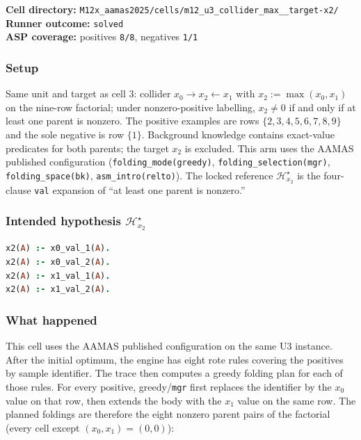 \documentclass[11pt]{article}
\begin{document}
\textbf{Cell directory:} \texttt{M12x\_aamas2025/cells/m12\_u3\_collider\_max\_\_target-x2/}\\
\textbf{Runner outcome:} \texttt{solved}\\
\textbf{ASP coverage:} positives \texttt{8/8}, negatives \texttt{1/1}

\subsubsection{Setup}

Same unit and target as cell 3: collider \(x_0\to x_2\leftarrow x_1\) with \(x_2:=\max(x_0,x_1)\) on the nine-row factorial; under nonzero-positive labelling, \(x_2\neq 0\) if and only if at least one parent is nonzero. The positive examples are rows \(\{2,3,4,5,6,7,8,9\}\) and the sole negative is row \(\{1\}\). Background knowledge contains exact-value predicates for both parents; the target \(x_2\) is excluded. This arm uses the AAMAS published configuration (\texttt{folding\_mode(greedy)}, \texttt{folding\_selection(mgr)}, \texttt{folding\_space(bk)}, \texttt{asm\_intro(relto)}). The locked reference \(\mathcal{H}_{x_2}^\star\) is the four-clause \texttt{val} expansion of ``at least one parent is nonzero.''

\subsubsection{\texorpdfstring{Intended hypothesis \(\mathcal{H}_{x_2}^\star\)}{Intended hypothesis H-star(x2)}}

\begin{lstlisting}[style=logic,language=Prolog]
x2(A) :- x0_val_1(A).
x2(A) :- x0_val_2(A).
x2(A) :- x1_val_1(A).
x2(A) :- x1_val_2(A).
\end{lstlisting}

\subsubsection{What happened}

This cell uses the AAMAS published configuration on the same U3 instance. After the initial optimum, the engine has eight rote rules covering the positives by sample identifier. The trace then computes a greedy folding plan for each of those rules. For every positive, greedy/\texttt{mgr} first replaces the identifier by the \(x_0\) value on that row, then extends the body with the \(x_1\) value on the same row. The planned foldings are therefore the eight nonzero parent pairs of the factorial (every cell except \((x_0,x_1)=(0,0)\)):
\end{document}
